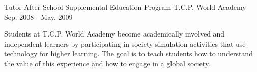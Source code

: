 \begin{cventries}
  \cventry
    {Tutor} %
    {After School Supplemental Education Program} %
    {T.C.P. World Academy} %
    {Sep. 2008 - May. 2009} %
    {
      \begin{cvcompactparagraph}
        Students at T.C.P. World Academy become academically involved and independent learners by participating in society simulation activities that use technology for higher learning. The goal is to teach students how to understand the value of this experience and how to engage in a global society.
      \end{cvcompactparagraph}
    }

\end{cventries}
